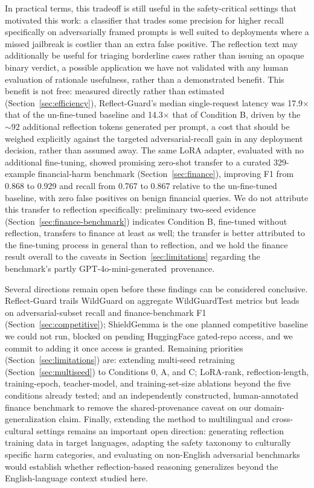 \documentclass[superintelligence,article,accept,moreauthors]{Definitions/mdpi}
\begin{document}
In practical terms, this tradeoff is still useful in the safety-critical settings that motivated this work: a classifier that trades some precision for higher recall specifically on adversarially framed prompts is well suited to deployments where a missed jailbreak is costlier than an extra false positive. The reflection text may additionally be useful for triaging borderline cases rather than issuing an opaque binary verdict, a possible application we have not validated with any human evaluation of rationale usefulness, rather than a demonstrated benefit. This benefit is not free: measured directly rather than estimated (Section~\ref{sec:efficiency}), Reflect-Guard's median single-request latency was 17.9$\times$ that of the un-fine-tuned baseline and 14.3$\times$ that of Condition B, driven by the $\sim$92 additional reflection tokens generated per prompt, a cost that should be weighed explicitly against the targeted adversarial-recall gain in any deployment decision, rather than assumed away. The same LoRA adapter, evaluated with no additional fine-tuning, showed promising zero-shot transfer to a curated 329-example financial-harm benchmark (Section~\ref{sec:finance}), improving F1 from 0.868 to 0.929 and recall from 0.767 to 0.867 relative to the un-fine-tuned baseline, with zero false positives on benign financial queries. %
 We do not attribute this transfer to reflection specifically: preliminary two-seed evidence (Section~\ref{sec:finance-benchmark}) indicates Condition B, fine-tuned without reflection, transfers to finance at least as well; the transfer is better attributed to the fine-tuning process in general than to reflection, and we hold the finance result overall to the caveats in Section~\ref{sec:limitations} regarding the benchmark's partly GPT-4o-mini-\mbox{generated provenance.}

Several directions remain open before these findings can be considered conclusive. Reflect-Guard trails WildGuard on aggregate WildGuardTest metrics but leads on adversarial-subset recall and finance-benchmark F1 (Section~\ref{sec:competitive}); ShieldGemma is the one planned competitive baseline we could not run, blocked on pending HuggingFace gated-repo access, and we commit to adding it once access is granted. Remaining priorities (Section~\ref{sec:limitations}) are: extending multi-seed retraining (Section~\ref{sec:multiseed}) to Conditions 0, A, and C; LoRA-rank, reflection-length, training-epoch, teacher-model, and training-set-size ablations beyond the five conditions already tested; and an independently constructed, human-annotated finance benchmark to remove the shared-provenance caveat on our domain-generalization claim. Finally, extending the method to multilingual and cross-cultural settings remains an important open direction: generating reflection training data in target languages, adapting the safety taxonomy to culturally specific harm categories, and evaluating on non-English adversarial benchmarks would establish whether reflection-based reasoning generalizes beyond the English-language context studied here.
\end{document}
